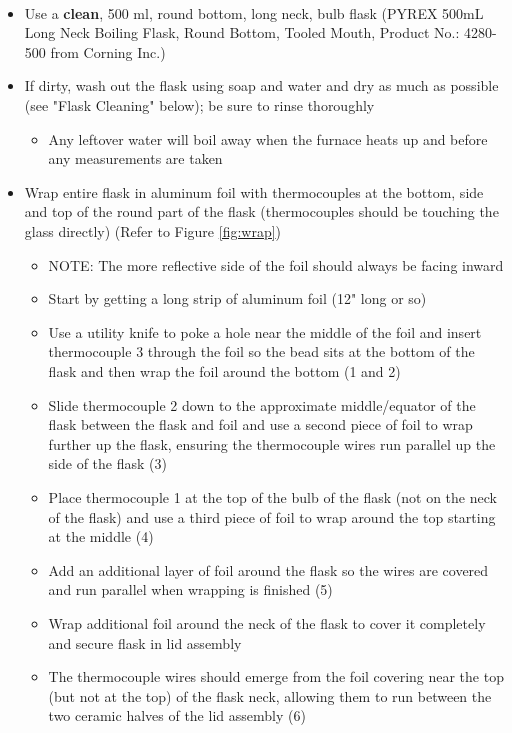 \documentclass[letterpaper,11pt]{article}
\begin{document}
\begin{itemize}
\begin{itemize}
        \item Use a \textbf{clean}, 500 ml, round bottom, long neck, bulb flask 
            (PYREX\textsuperscript{\textcopyright} 500mL Long Neck Boiling 
            Flask, Round Bottom, Tooled Mouth, Product No.: 4280-500 from 
            Corning Inc.)
        \item If dirty, wash out the flask using soap and water and dry as much 
            as possible (see "Flask Cleaning" below); be sure to rinse
            thoroughly
                \begin{itemize}
                \item Any leftover water will boil away when the furnace heats 
                up and before any measurements are taken
                \end{itemize}        
        \item Wrap entire flask in aluminum foil with thermocouples at the 
            bottom, side and top of the round part of the flask (thermocouples 
            should be touching the glass directly) (Refer to Figure 
            \ref{fig:wrap})
                \begin{itemize}
                \item NOTE: The more reflective side of the foil should always 
                    be facing inward
                \item Start by getting a long strip of aluminum foil (12" long 
                    or so)
                \item Use a utility knife to poke a hole near the middle of 
                    the foil and insert thermocouple 3 through the foil so the 
                    bead sits at the bottom of the flask and then wrap the foil 
                    around the bottom (1 and 2)
                \item Slide thermocouple 2 down to the approximate 
                    middle/equator of the flask between the flask and foil and 
                    use a second piece of foil to wrap further up the flask, 
                    ensuring the thermocouple wires run parallel up the side of 
                    the flask (3)
                \item Place thermocouple 1 at the top of the bulb of the flask 
                    (not on the neck of the flask) and use a third piece of foil
                     to wrap around the top starting at the middle (4)
                \item Add an additional layer of foil around  the flask so the 
                    wires are covered and run parallel when wrapping is finished
                    (5)
                \item Wrap additional foil around the neck of the flask to cover 
                    it completely and secure flask in lid assembly
                \item The thermocouple wires should emerge from the foil 
                    covering near the top (but not at the top) of the flask 
                    neck, allowing them to run between the two ceramic halves of
                    the lid assembly (6)
                \end{itemize}


\end{itemize}
\end{itemize}
\end{document}
